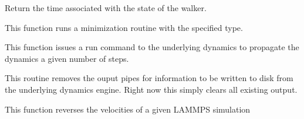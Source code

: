 \documentclass[letterpaper,10pt,english]{sphinxmanual}
\begin{document}
\begin{fulllineitems}
\begin{fulllineitems}
\end{fulllineitems}


\begin{fulllineitems}
\label{walker_api/walker_api.doc:lammpsWalker.lammpsWalker.get_time}
Return the time associated with the state of the walker.

\end{fulllineitems}


\begin{fulllineitems}
\label{walker_api/walker_api.doc:lammpsWalker.lammpsWalker.minimize}
This function runs a minimization routine with the specified type.

\end{fulllineitems}


\begin{fulllineitems}
\label{walker_api/walker_api.doc:lammpsWalker.lammpsWalker.propagate}
This function issues a run command to the underlying dynamics to propagate the dynamics a given number of steps.

\end{fulllineitems}


\begin{fulllineitems}
\label{walker_api/walker_api.doc:lammpsWalker.lammpsWalker.removeOutput}
This routine removes the ouput pipes for information to be written to disk from the underlying dynamics engine. Right now this simply clears all existing output.

\end{fulllineitems}


\begin{fulllineitems}
\label{walker_api/walker_api.doc:lammpsWalker.lammpsWalker.reverseVel}
This function reverses the velocities of a given LAMMPS simulation


\end{fulllineitems}
\end{fulllineitems}
\end{document}
